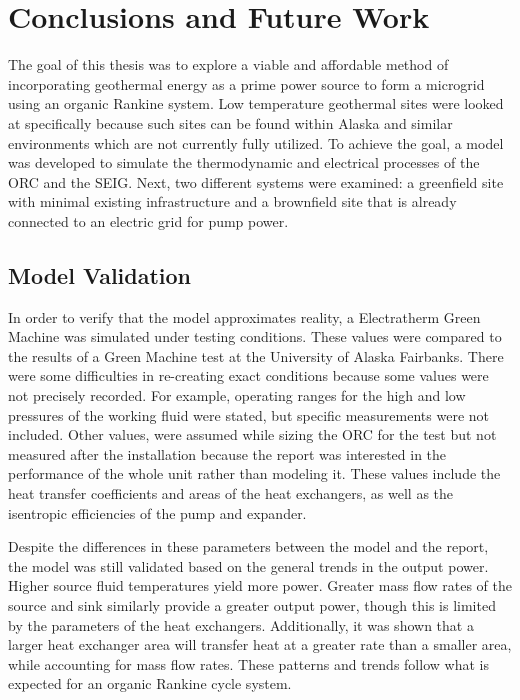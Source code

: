 \chapter{Conclusions and Future Work}
\label{ch:conclusion}

The goal of this thesis was to explore a viable and affordable method of incorporating geothermal energy as a prime power source to form a microgrid using an organic Rankine system. Low temperature geothermal sites were looked at specifically because such sites can be found within Alaska and similar environments which are not currently fully utilized. To achieve the goal, a model was developed to simulate the thermodynamic and electrical processes of the ORC and the SEIG. Next, two different systems were examined: a greenfield site with minimal existing infrastructure and a brownfield site that is already connected to an electric grid for pump power. 

\section{Model Validation}
In order to verify that the model approximates reality, a Electratherm Green Machine was simulated under testing conditions. These values were compared to the results of a Green Machine test at the University of Alaska Fairbanks. There were some difficulties in re-creating exact conditions because some values were not precisely recorded. For example, operating ranges for the high and low pressures of the working fluid were stated, but specific measurements were not included. 
Other values, were assumed while sizing the ORC for the test but not measured after the installation because the report was interested in the performance of the whole unit rather than modeling it. These values include the heat transfer coefficients and areas of the heat exchangers, as well as the isentropic efficiencies of the pump and expander.

Despite the differences in these parameters between the model and the report, the model was still validated based on the general trends in the output power. Higher source fluid temperatures yield more power. Greater mass flow rates of the source and sink similarly provide a greater output power, though this is limited by the parameters of the heat exchangers. Additionally, it was shown that a larger heat exchanger area will transfer heat at a greater rate than a smaller area, while accounting for mass flow rates. These patterns and trends follow what is expected for an organic Rankine cycle system.

